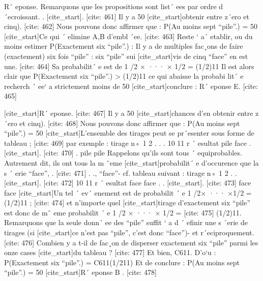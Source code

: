 R´ eponse. Remarquons que les propositions sont list´ ees par ordre d ´ecroissant. . [cite_start]. [cite: 461]
Il y a 50%
 [cite_start]obtenir entre z´ero et cinq). [cite: 462]
Nous pouvons donc affirmer que : 
 P(Au moins sept “pile”.) = 50%
 [cite_start]Ce qui ´ elimine A,B d’embl ´ee. [cite: 463]
Reste ` a´ etablir, ou du moins estimer P(Exactement six “pile”.) :
 Il y a de multiples fac¸ons de faire (exactement) six fois “pile” : six “pile” sui 
 [cite_start]vis de cinq “face” en est une. [cite: 464]
Sa probabilit´ e est de 1 /2 × ··· × 1/2 = (1/2)11 Il
 est alors clair que P(Exactement six “pile”.) > (1/2)11 ce qui abaisse la probabi 
 lit´ e recherch ´ ee` a strictement moins de 50%
 [cite_start]conclure : R´ eponse E. [cite: 465]

[cite_start]R´ eponse. [cite: 467]
Il y a 50%
 [cite_start]chances d’en obtenir entre z´ero et cinq). [cite: 468]
Nous pouvons donc affirmer que : 
 P(Au moins sept “pile”.) = 50%
 [cite_start]L’ensemble des tirages peut se pr´esenter sous forme de tableau ; [cite: 469]
par exemple : 
 tirage n◦ 1 2 . . . 10 11
 r
 ´ esultat pile face . [cite_start]. [cite: 470]
. pile pile
 Rappelons qu’ils sont tous ´ equiprobables. Autrement dit, ils ont tous la m ˆeme 
 [cite_start]probabilit´ e d’occurence que la s ´ erie “face”, . [cite: 471]
. ., “face”- cf. tableau suivant :
 tirage n◦ 1 2 . . [cite_start]. [cite: 472]
10 11
 r
 ´ esultat face face . . [cite_start]. [cite: 473]
face face
 [cite_start]Un tel ´ ev´ enement est de probabilit ´ e 1 /2× ··· ×1/2 = (1/2)11 ; [cite: 474]
et n’importe quel
 [cite_start]tirage d’exactement six “pile” est donc de mˆ eme probabilit ´ e 1 /2 × ··· × 1/2 = [cite: 475]
(1/2)11.
 Remarquons que la seule donn´ ee des “pile” suffit ` a d ´ efinir une s ´erie de tirages (si 
 [cite_start]ce n’est pas “pile”, c’est donc “face”)- et r´eciproquement. [cite: 476]
Combien y a t-il de fac¸on de disperser exactement six “pile” parmi les onze cases
 [cite_start]du tableau ? [cite: 477]
Et bien, C611. D’o`u : 
 P(Exactement six “pile”.) = C611(1/211)
 Et de conclure :
 P(Au moins sept “pile”.) = 50%
 [cite_start]R´ eponse B . [cite: 478]

